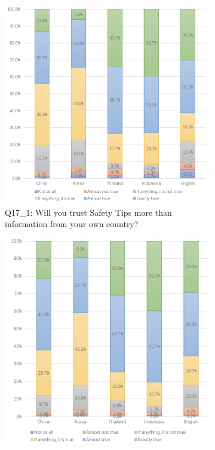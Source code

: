 \begin{figure}[h]
  \begin{subfigure}{0.48\textwidth}
  \includegraphics[width=\linewidth]{Figure/Figure15.jpg}
  \centering
  \caption{Q17\_1: Will you trust Safety Tips more than information from your own country?}
  \label{fig15}
  \end{subfigure}\hfill
  \begin{subfigure}{0.48\textwidth}
  \includegraphics[width=\linewidth]{Figure/Figure16.jpg}

\end{subfigure}
\end{figure}
